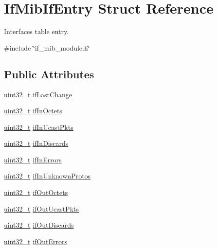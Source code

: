 \hypertarget{structIfMibIfEntry}{}\section{If\+Mib\+If\+Entry Struct Reference}
\label{structIfMibIfEntry}


Interfaces table entry.  




{\ttfamily \#include \char`\"{}if\+\_\+mib\+\_\+module.\+h\char`\"{}}

\subsection*{Public Attributes}
\begin{DoxyCompactItemize}
\item 
\hyperlink{stdint_8h_a435d1572bf3f880d55459d9805097f62}{uint32\+\_\+t} \hyperlink{structIfMibIfEntry_a3f8edc50f37f29cbbfb4664010df7ba9}{if\+Last\+Change}
\item 
\hyperlink{stdint_8h_a435d1572bf3f880d55459d9805097f62}{uint32\+\_\+t} \hyperlink{structIfMibIfEntry_a5648d4f845dd71b19056524184c68ee5}{if\+In\+Octets}
\item 
\hyperlink{stdint_8h_a435d1572bf3f880d55459d9805097f62}{uint32\+\_\+t} \hyperlink{structIfMibIfEntry_a7e9081beb20cde7e344ad3002afcc769}{if\+In\+Ucast\+Pkts}
\item 
\hyperlink{stdint_8h_a435d1572bf3f880d55459d9805097f62}{uint32\+\_\+t} \hyperlink{structIfMibIfEntry_af87be9e678bf819eae6d9b71748811db}{if\+In\+Discards}
\item 
\hyperlink{stdint_8h_a435d1572bf3f880d55459d9805097f62}{uint32\+\_\+t} \hyperlink{structIfMibIfEntry_ab1f9925512bfa34b85b5258c56d1307e}{if\+In\+Errors}
\item 
\hyperlink{stdint_8h_a435d1572bf3f880d55459d9805097f62}{uint32\+\_\+t} \hyperlink{structIfMibIfEntry_a07ee897158eb93cfb25512c6eff13369}{if\+In\+Unknown\+Protos}
\item 
\hyperlink{stdint_8h_a435d1572bf3f880d55459d9805097f62}{uint32\+\_\+t} \hyperlink{structIfMibIfEntry_a84ccab237960cd7e7bc3f5b39bd88071}{if\+Out\+Octets}
\item 
\hyperlink{stdint_8h_a435d1572bf3f880d55459d9805097f62}{uint32\+\_\+t} \hyperlink{structIfMibIfEntry_aacaaf6c959c48cd89cb423930b2fe300}{if\+Out\+Ucast\+Pkts}
\item 
\hyperlink{stdint_8h_a435d1572bf3f880d55459d9805097f62}{uint32\+\_\+t} \hyperlink{structIfMibIfEntry_a513b1816145273f0a8c76ed0aa632e8e}{if\+Out\+Discards}
\item 
\hyperlink{stdint_8h_a435d1572bf3f880d55459d9805097f62}{uint32\+\_\+t} \hyperlink{structIfMibIfEntry_a6e2a5f25673dd66c56c63972f57bf2dd}{if\+Out\+Errors}
\end{DoxyCompactItemize}


